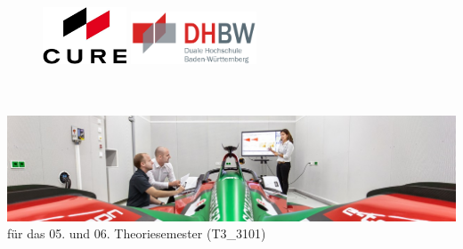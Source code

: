 

\begin{titlepage}

\centering
\begin{figure}[t]
    \begin{minipage}[]{0.49\textwidth}
        \flushleft
        \includegraphics[width=2.5cm]{images/essential/firmenlogo.png}
    \end{minipage}
    \begin{minipage}[]{0.49\textwidth}
        \flushright
        \includegraphics[width=3.73cm]{images/essential/dhbw.png}
    \end{minipage}
\end{figure}

\enlargethispage{20mm}

\begin{center}
	\vspace*{6mm}	{\arbeit}\\
	\doublespacing
	\vspace*{12mm}	{\LARGE\textbf{{\titel}}}\\
	\onehalfspacing
	\vspace*{12mm}	\includegraphics[width=16cm]{images/cover_sample.jpg}\\
	\vspace*{12mm}	für das 05. und 06. Theoriesemester (T3\_3101)\\
	\vspace*{3mm}		\langartikelstudiengang{} \langstudiengang{} \textbf{\studiengang}\\
	\vspace*{3mm}		\langanderdh{} \dhbw\\
	\vspace*{7mm}	\langvon\\
	\vspace*{3mm}		{\large\textbf \autor}\\
	\vspace*{7mm}	\datumAbgabe\\
\end{center}


\end{titlepage}
